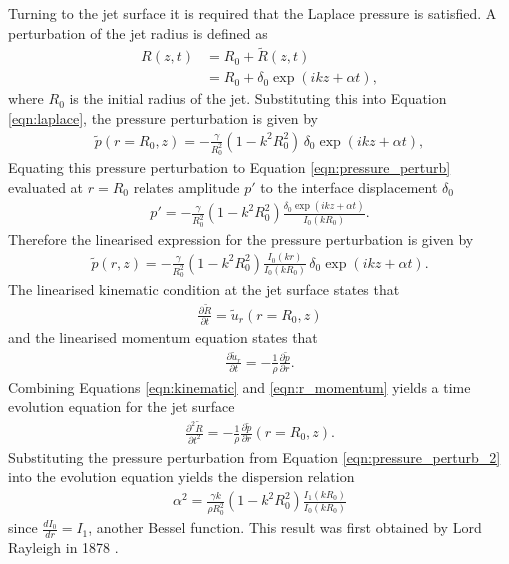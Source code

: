 \documentclass[11pt]{article}
\newcommand{\od}[2]{\frac{d #1}{d #2}}
\newcommand{\pd}[2]{\frac{\partial #1}{\partial #2}}
\newcommand{\pdtwo}[2]{\frac{\partial ^2 #1}{\partial #2 ^2}}
\begin{document}
Turning to the jet surface it is required that the Laplace pressure is satisfied. A perturbation of the jet radius is defined as
\begin{align*}
R(z,t) &=  R_0 + \tilde{R} (z,t) \nonumber \\
& = R_0 + \delta_0 \exp(ikz + \alpha t),
\end{align*}
where $R_0$ is the initial radius of the jet. Substituting this into Equation \ref{eqn:laplace}, the pressure perturbation is given by
\begin{align*}
\tilde{p}(r=R_0,z) = -\frac{\gamma}{R_0^2} (1 - k^2 R_0^2) \, \delta_0 \exp(ikz + \alpha t),
\end{align*}
Equating this pressure perturbation to Equation \ref{eqn:pressure_perturb} evaluated at $r=R_0$ relates amplitude $p'$ to the interface displacement $\delta_0$
\begin{align*}
p' = -\frac{\gamma}{R_0^2}(1-k^2 R_0^2) \frac{\delta_0 \exp (ikz + \alpha t)}{I_0(kR_0)}.
\end{align*}
Therefore the linearised expression for the pressure perturbation is given by
\begin{align}
\tilde{p}(r,z) = -\frac{\gamma}{R_0^2} (1 - k^2 R_0^2) \frac{I_0(kr)}{I_0 (kR_0)} \, \delta_0 \exp(ikz + \alpha t).
\label{eqn:pressure_perturb_2}
\end{align}
The linearised kinematic condition at the jet surface states that
\begin{align}
\pd{\tilde{R}}{t} = \tilde{u}_r(r =R_0,z)
\label{eqn:kinematic}
\end{align}
and the linearised momentum equation states that
\begin{align}
\pd{\tilde{u}_r}{t} = - \frac{1}{\rho} \pd{\tilde{p}}{r}.
\label{eqn:r_momentum}
\end{align}
Combining Equations \ref{eqn:kinematic} and \ref{eqn:r_momentum} yields a time evolution equation for the jet surface
\begin{align}
\pdtwo{\tilde{R}}{t} = - \frac{1}{\rho} \pd{\tilde{p}}{r}(r = R_0, z).
\end{align}
Substituting the pressure perturbation from Equation \ref{eqn:pressure_perturb_2} into the evolution equation yields the dispersion relation
\begin{align}
\alpha^2 = \frac{\gamma k}{\rho R_0^2} (1 - k^2 R_0^2) \frac{I_1(kR_0)}{I_0(kR_0)}
\label{eqn:dispersion_rayleigh}
\end{align}
since $\od{I_0}{r} = I_1$, another Bessel function. This result was first obtained by Lord Rayleigh in 1878 \cite{strutt1878instability}.
\end{document}
